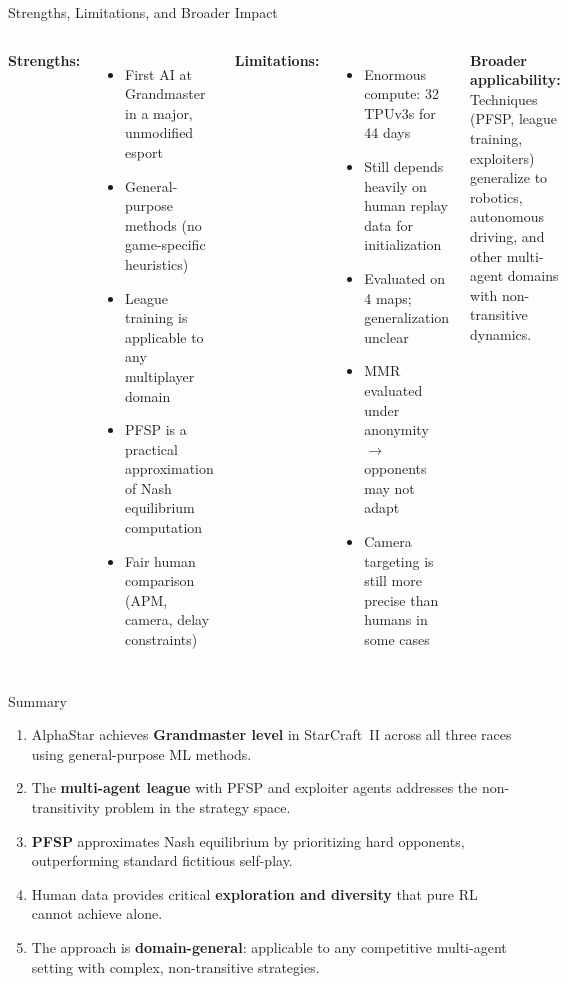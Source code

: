 \documentclass[aspectratio=169]{beamer}
\begin{document}
\begin{frame}{Strengths, Limitations, and Broader Impact}
\begin{columns}[T]
\textbf{Strengths:}
\begin{itemize}
    \item First AI at Grandmaster in a major, unmodified esport
    \item General-purpose methods (no game-specific heuristics)
    \item League training is applicable to any multiplayer domain
    \item PFSP is a practical approximation of Nash equilibrium computation
    \item Fair human comparison (APM, camera, delay constraints)
\end{itemize}

\textbf{Limitations:}
\begin{itemize}
    \item Enormous compute: 32 TPUv3s for 44 days
    \item Still depends heavily on human replay data for initialization
    \item Evaluated on 4 maps; generalization unclear
    \item MMR evaluated under anonymity $\to$ opponents may not adapt
    \item Camera targeting is still more precise than humans in some cases
\end{itemize}

\vspace{0.3em}
\textbf{Broader applicability:}\\
Techniques (PFSP, league training, exploiters) generalize to robotics, autonomous driving, and other multi-agent domains with non-transitive dynamics.
\end{columns}
\end{frame}

\begin{frame}{Summary}
\begin{enumerate}
    \item AlphaStar achieves \textbf{Grandmaster level} in StarCraft~II across all three races using general-purpose ML methods.
    \item The \textbf{multi-agent league} with PFSP and exploiter agents addresses the non-transitivity problem in the strategy space.
    \item \textbf{PFSP} approximates Nash equilibrium by prioritizing hard opponents, outperforming standard fictitious self-play.
    \item Human data provides critical \textbf{exploration and diversity} that pure RL cannot achieve alone.
    \item The approach is \textbf{domain-general}: applicable to any competitive multi-agent setting with complex, non-transitive strategies.
\end{enumerate}
\end{frame}
\end{document}
